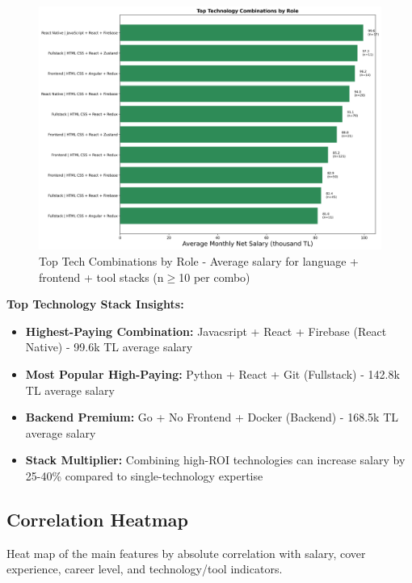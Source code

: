 \documentclass[12pt,a4paper]{article}
\begin{document}
\begin{figure}[H]
    \centering
    \includegraphics[width=\textwidth]{figures/barplot_tech_combinations_by_role.png}
    \caption{Top Tech Combinations by Role - Average salary for language + frontend + tool stacks (n\ensuremath{{\geq}}10 per combo)}
\end{figure}

\textbf{Top Technology Stack Insights:}
\begin{itemize}
    \item \textbf{Highest-Paying Combination:} Javacsript + React + Firebase (React Native) - 99.6k TL average salary
    \item \textbf{Most Popular High-Paying:} Python + React + Git (Fullstack) - 142.8k TL average salary
    \item \textbf{Backend Premium:} Go + No Frontend + Docker (Backend) - 168.5k TL average salary
    \item \textbf{Stack Multiplier:} Combining high-ROI technologies can increase salary by 25-40\% compared to single-technology expertise
\end{itemize}

\subsection{Correlation Heatmap}
Heat map of the main features by absolute correlation with salary, cover experience, career level, and technology/tool indicators.
\end{document}
